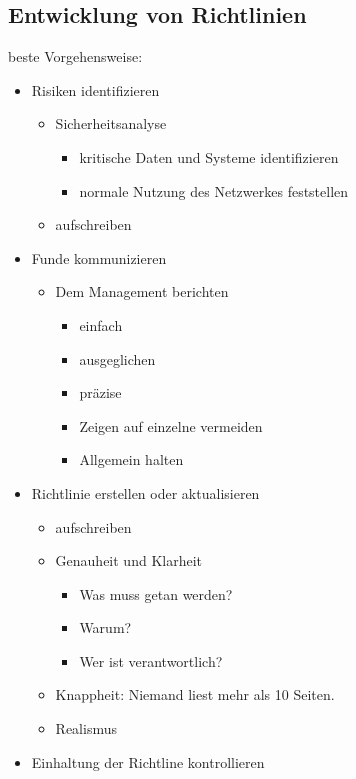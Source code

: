 \documentclass{article} %
\begin{document}
\subsection{Entwicklung von Richtlinien}
beste Vorgehensweise:
\begin{itemize}
	\item Risiken identifizieren
    
    \begin{itemize}
        \item Sicherheitsanalyse
        
        \begin{itemize}
            \item kritische Daten und Systeme identifizieren
            \item normale Nutzung des Netzwerkes feststellen
        \end{itemize}
        \item aufschreiben
    \end{itemize}
    \item Funde kommunizieren
    
    \begin{itemize}
        \item Dem Management berichten
        
        \begin{itemize}
            \item einfach
            \item ausgeglichen
            \item präzise
            \item Zeigen auf einzelne vermeiden
            \item Allgemein halten
        \end{itemize}
    \end{itemize}
    \item Richtlinie erstellen oder aktualisieren
    
    \begin{itemize}
        \item aufschreiben
        \item Genauheit und Klarheit
        
        \begin{itemize}
            \item Was muss getan werden?
            \item Warum?
            \item Wer ist verantwortlich?
        \end{itemize}
        \item Knappheit: Niemand liest mehr als 10 Seiten.
        \item Realismus
    \end{itemize}
    \item Einhaltung der Richtline kontrollieren
    

\end{itemize}
\end{document}
